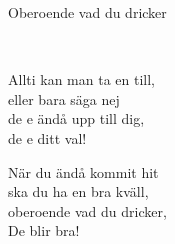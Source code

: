 \begin{song}{Oberoende vad du dricker}

	\\

	
	Allti kan man ta en till,\\
	eller bara säga nej\\
	de e ändå upp till dig,\\
	de e ditt val!

	När du ändå kommit hit\\
	ska du ha en bra kväll,\\
	oberoende vad du dricker,\\
	De blir bra!

	
\end{song}
